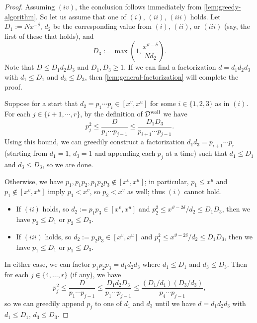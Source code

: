 \documentclass[reqno,11pt]{amsart}
\theoremstyle{remark}
\numberwithin{equation}{section}
\newcommand{\mDw}{\mathcal{D}^{\textnormal{well}}}
\begin{document}
\begin{proof}
Assuming $(iv)$, the conclusion follows immediately from \cref{lem:greedy-algorithm}. So let us assume that one of $(i)$, $(ii)$, $(iii)$ holds. Let $D_1 := N x^{-\delta}$, $d_2$ be the corresponding value from $(i)$, $(ii)$, or $(iii)$ (say, the first of these that holds), and 
\[
    D_3 := \max\left(1, \frac{x^{\vartheta-\delta}}{Nd_2}\right).
\]
Note that $D \le D_1d_2D_3$ and $D_1, D_3 \ge 1$. If we can find a factorization $d = d_1d_2d_3$ with $d_1 \le D_1$ and $d_3 \le D_3$, then \cref{lem:general-factorization} will complete the proof.

Suppose for a start that $d_2 = p_1 \cdots p_i \in [x^v, x^u]$ for some $i \in \{1, 2, 3\}$ as in $(i)$. For each $j \in \{i+1, \cdots, r\}$, by the definition of $\mDw$ we have 
\[
    p_j^2 \le \frac{D}{p_1 \cdots p_{j-1}} \le \frac{D_1 D_3}{p_{i+1}\cdots p_{j-1}}.
\]
Using this bound, we can greedily construct a factorization $d_1 d_3 = p_{i+1} \cdots p_r$ (starting from $d_1 = 1$, $d_3 = 1$ and appending each $p_j$ at a time) such that $d_1 \le D_1$ and $d_3 \le D_3$, so we are done. 

Otherwise, we have $p_1, p_1p_2, p_1p_2p_3 \not\in [x^v, x^u]$; in particular, $p_1 \le x^u$ and $p_1 \not \in [x^v, x^u]$ imply $p_1 < x^v$, so $p_2 < x^v$ as well; thus $(i)$ cannot hold.
\begin{itemize}
    \item If $(ii)$ holds, so $d_2 := p_1p_3 \in [x^v, x^u]$ and $p_2^2 \le x^{\vartheta-2\delta}/d_2 \le D_1 D_3$, then we have $p_2 \le D_1$ or $p_2 \le D_3$. 
    \item If $(iii)$ holds, so $d_2 := p_2p_3 \in [x^v, x^u]$ and $p_1^2 \le x^{\vartheta-2\delta}/d_2 \le D_1 D_3$, then we have $p_1 \le D_1$ or $p_1 \le D_3$.
\end{itemize}
In either case, we can factor $p_1p_2p_3 = d_1d_2d_3$ where $d_1 \le D_1$ and $d_3 \le D_3$. Then for each $j \in \{4, \ldots, r\}$ (if any), we have
\[
    p_j^2 \le \frac{D}{p_1 \cdots p_{j-1}} \le \frac{D_1d_2D_3}{p_1 \cdots p_{j-1}} \le \frac{(D_1/d_1) (D_3/d_3)}{p_4 \cdots p_{j-1}},
\]
so we can greedily append $p_j$ to one of $d_1$ and $d_3$ until we have $d = d_1d_2d_3$ with $d_1 \le D_1$, $d_3 \le D_3$.
\end{proof}
\end{document}
